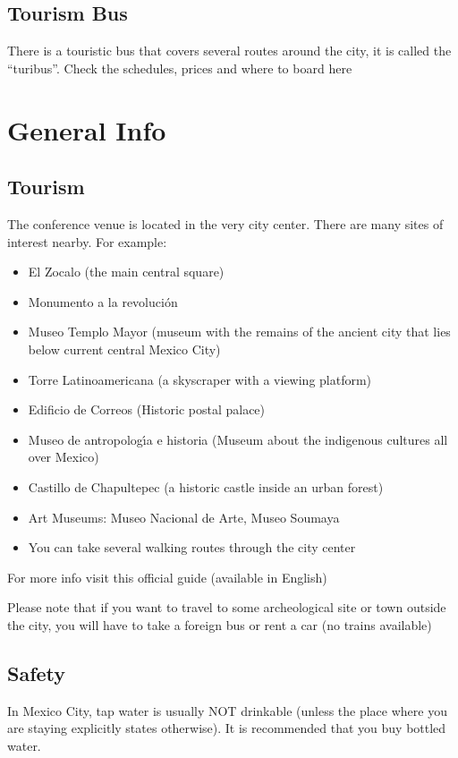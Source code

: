 \subsection*{Tourism Bus}
There is a touristic bus that covers several routes around the city, it is called the ``turibus''. Check the schedules, prices and where to board here


\section*{General Info}

\subsection*{Tourism}
The conference venue is located in the very city center. There are many sites of interest nearby. For example:

\begin{itemize}
  \setlength\parskip{0em}
  \setlength\itemsep{0.3em}
\item El Zocalo (the main central square)
\item Monumento a la revoluci\'on
\item Museo Templo Mayor (museum with the remains of the ancient city that lies below current central Mexico City)
\item Torre Latinoamericana (a skyscraper with a viewing platform)
\item Edificio de Correos (Historic postal palace)
\item Museo de antropolog\'{\i}a e historia (Museum about the indigenous cultures all over Mexico)
\item Castillo de Chapultepec (a historic castle inside an urban forest)
\item  Art Museums: Museo Nacional de Arte, Museo Soumaya
\item You can take several walking routes through the city center
\end{itemize}

For more info visit this official guide (available in English)

Please note that if you want to travel to some archeological site or town outside the city, you will have to take a foreign bus or rent a car (no trains available)

\subsection*{Safety}
In Mexico City, tap water is usually NOT drinkable (unless the place where you are staying explicitly states otherwise). It is recommended that you buy bottled water.

